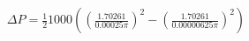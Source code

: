 \documentclass[preview]{standalone}
\begin{document}
\begin{align*}
\Delta P = \frac{1}{2} 1000 ((\frac{1.70261}{0.00025\pi})^2 - (\frac{1.70261}{0.00000625\pi})^2)
\end{align*}
\end{document}
